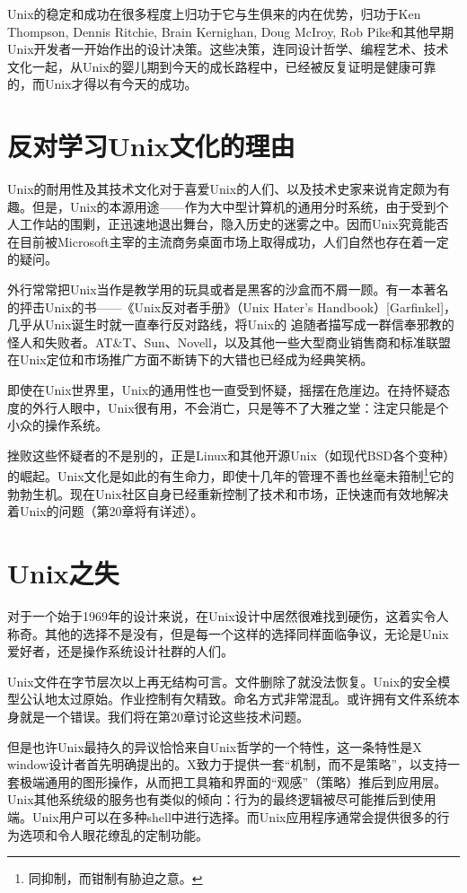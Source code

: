 \documentclass[11pt,oneside]{book}
\begin{document}
\begin{common-format}
Unix的稳定和成功在很多程度上归功于它与生俱来的内在优势，归功于Ken Thompson, Dennis Ritchie, Brain Kernighan, Doug McIroy, Rob Pike和其他早期Unix开发者一开始作出的设计决策。这些决策，连同设计哲学、编程艺术、技术文化一起，从Unix的婴儿期到今天的成长路程中，已经被反复证明是健康可靠的，而Unix才得以有今天的成功。


\section{反对学习Unix文化的理由}
Unix的耐用性及其技术文化对于喜爱Unix的人们、以及技术史家来说肯定颇为有趣。但是，Unix的本源用途——作为大中型计算机的通用分时系统，由于受到个人工作站的围剿，正迅速地退出舞台，隐入历史的迷雾之中。因而Unix究竟能否在目前被Microsoft主宰的主流商务桌面市场上取得成功，人们自然也存在着一定的疑问。

外行常常把Unix当作是教学用的玩具或者是黑客的沙盒而不屑一顾。有一本著名的抨击Unix的书——《Unix反对者手册》（Unix Hater's Handbook）[Garfinkel]，几乎从Unix诞生时就一直奉行反对路线，将Unix的 追随者描写成一群信奉邪教的怪人和失败者。AT\&{}T、Sun、Novell，以及其他一些大型商业销售商和标准联盟在Unix定位和市场推广方面不断铸下的大错也已经成为经典笑柄。

即使在Unix世界里，Unix的通用性也一直受到怀疑，摇摆在危崖边。在持怀疑态度的外行人眼中，Unix很有用，不会消亡，只是等不了大雅之堂：注定只能是个小众的操作系统。

挫败这些怀疑者的不是别的，正是Linux和其他开源Unix（如现代BSD各个变种）的崛起。Unix文化是如此的有生命力，即使十几年的管理不善也丝毫未箝制\footnote{同抑制，而钳制有胁迫之意。}它的勃勃生机。现在Unix社区自身已经重新控制了技术和市场，正快速而有效地解决着Unix的问题（第20章将有详述）。


\section{Unix之失}
对于一个始于1969年的设计来说，在Unix设计中居然很难找到硬伤，这着实令人称奇。其他的选择不是没有，但是每一个这样的选择同样面临争议，无论是Unix爱好者，还是操作系统设计社群的人们。

Unix文件在字节层次以上再无结构可言。文件删除了就没法恢复。Unix的安全模型公认地太过原始。作业控制有欠精致。命名方式非常混乱。或许拥有文件系统本身就是一个错误。我们将在第20章讨论这些技术问题。

但是也许Unix最持久的异议恰恰来自Unix哲学的一个特性，这一条特性是X window设计者首先明确提出的。X致力于提供一套“机制，而不是策略”，以支持一套极端通用的图形操作，从而把工具箱和界面的“观感”（策略）推后到应用层。Unix其他系统级的服务也有类似的倾向：行为的最终逻辑被尽可能推后到使用端。Unix用户可以在多种shell中进行选择。而Unix应用程序通常会提供很多的行为选项和令人眼花缭乱的定制功能。


\end{common-format}
\end{document}

